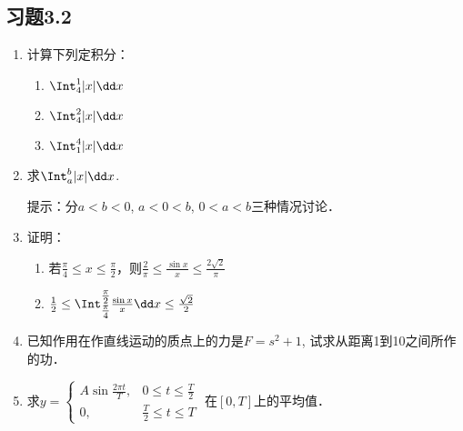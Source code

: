 \subsection*{习题3.2}
\begin{enumerate}
    \item 计算下列定积分：
\begin{multicols}{3}
\begin{enumerate}
    \item $\Int^1_4 |x|\dd x$
    \item $\Int^2_4 |x|\dd x$
    \item $\Int^4_1 |x|\dd x$
\end{enumerate}
\end{multicols}
\item 求$\Int^b_a |x|\dd x$.

提示：分$a<b<0$, $a<0<b$, $0<a<b$三种情况讨论．
\item 证明：
\begin{enumerate}
    \item 若$\frac{\pi}{4}\le x\le\frac{\pi}{2}$，则$\frac{2}{\pi}\le \frac{\sin x}{x}\le \frac{2\sqrt{2}}{\pi}$
    \item $\frac{1}{2}\le \Int^{\tfrac{\pi}{2}}_{\tfrac{\pi}{4}}\frac{\sin x}{x}\dd x\le \frac{\sqrt{2}}{2}$
\end{enumerate}
\item 已知作用在作直线运动的质点上的力是$F=s^2+1$, 试求从距离1到10之间所作的功．
\item 求$y=\begin{cases}
    A\sin\frac{2\pi t}{T}, & 0\le t\le \frac{T}{2}\\
    0,& \frac{T}{2}\le t\le T
\end{cases}$ 在$[0,T]$上的平均值．
\end{enumerate}